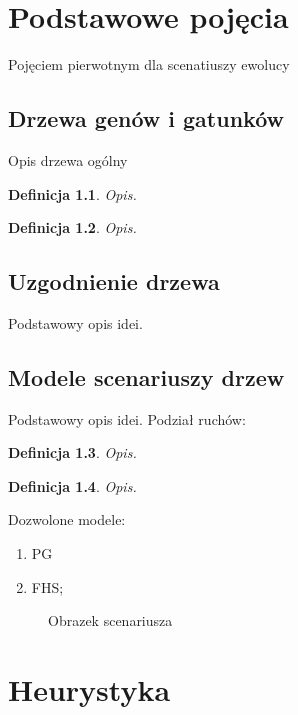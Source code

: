 \documentclass[licencjacka]{pracamgr}
\newtheorem{defi}{Definicja}[section]
\begin{document}
\chapter{Podstawowe pojęcia}\label{r:pojecia}

Pojęciem pierwotnym dla scenatiuszy ewolucy

\section{Drzewa genów i gatunków}
Opis drzewa ogólny



\begin{defi}\label{Drzewa genów}
  Opis.
\end{defi}

\begin{defi}\label{Drzewa gatunków}
  Opis.
\end{defi}

\section{Uzgodnienie drzewa}
Podstawowy opis idei.

\section{Modele scenariuszy drzew}

Podstawowy opis idei. Podział ruchów:

\begin{defi}\label{TMOVE}
  Opis.
\end{defi}

\begin{defi}\label{CLOST}
  Opis.
\end{defi}

Dozwolone modele:
\begin{enumerate}
\item PG
\item FHS;
\end{enumerate}

\begin{figure}[tp]
  \centering
  \caption{Obrazek scenariusza}
\end{figure}

\chapter{Heurystyka}\label{r:heurystyka}
\end{document}

